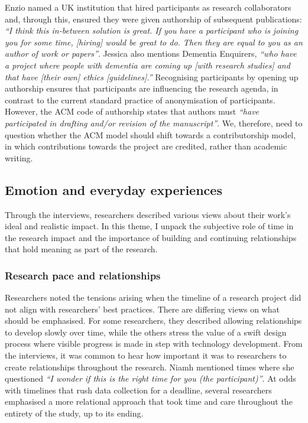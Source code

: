 Enzio named a UK institution that hired participants as research collaborators and, through this, ensured they were given authorship of subsequent publications: \textit{``I think this in-between solution is great. If you have a participant who is joining you for some time, [hiring] would be great to do. Then they are equal to you as an author of work or papers''}. Jessica also mentions Dementia Enquirers, \textit{``who have a project where people with dementia are coming up [with research studies] and that have [their own] ethics [guidelines].''} Recognising participants by opening up authorship ensures that participants are influencing the research agenda, in contrast to the current standard practice of anonymisation of participants. However, the ACM code of authorship states that authors must \textit{``have participated in drafting and/or revision of the manuscript''}. We, therefore, need to question whether the ACM model should shift towards a contributorship model, in which contributions towards the project are credited, rather than academic writing.

\subsection{Emotion and everyday experiences}
\label{Ethics:ThemePartTwo}
Through the interviews, researchers described various views about their work’s ideal and realistic impact. In this theme, I unpack the subjective role of time in the research impact and the importance of building and continuing relationships that hold meaning as part of the research.

\subsubsection{Research pace and relationships}
\label{Ethics:ThemePartTwo:Time}
Researchers noted the tensions arising when the timeline of a research project did not align with researchers' best practices. There are differing views on what should be emphasised. For some researchers, they described allowing relationships to develop slowly over time, while the others stress the value of a swift design process where visible progress is made in step with technology development. From the interviews, it was common to hear how important it was to researchers to create relationships throughout the research. Niamh mentioned times where she questioned \textit{``I wonder if this is the right time for you (the participant)''}. At odds with timelines that rush data collection for a deadline, several researchers emphasised a more relational approach that took time and care throughout the entirety of the study, up to its ending. 

